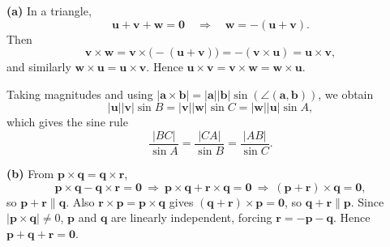 \begin{solution}
\textbf{(a)} In a triangle,
\[
\mathbf u+\mathbf v+\mathbf w=\mathbf 0
\quad\Longrightarrow\quad
\mathbf w=-(\mathbf u+\mathbf v).
\]
Then
\[
\mathbf v\times \mathbf w=\mathbf v\times\bigl(-(\mathbf u+\mathbf v)\bigr)=-(\mathbf v\times\mathbf u)=\mathbf u\times\mathbf v,
\]
and similarly \(\mathbf w\times\mathbf u=\mathbf u\times\mathbf v\). Hence
\(\mathbf u\times\mathbf v=\mathbf v\times\mathbf w=\mathbf w\times\mathbf u\).

Taking magnitudes and using \(|\mathbf a\times\mathbf b|=|\mathbf a||\mathbf b|\sin(\angle(\mathbf a,\mathbf b))\),
we obtain
\[
|\mathbf u||\mathbf v|\sin B=|\mathbf v||\mathbf w|\sin C=|\mathbf w||\mathbf u|\sin A,
\]
which gives the sine rule
\[
\frac{|BC|}{\sin A}=\frac{|CA|}{\sin B}=\frac{|AB|}{\sin C}.
\]

\medskip
\noindent\textbf{(b)} From \(\mathbf p\times\mathbf q=\mathbf q\times\mathbf r\),
\[
\mathbf p\times\mathbf q-\mathbf q\times\mathbf r=\mathbf 0
\ \Longrightarrow\
\mathbf p\times\mathbf q+\mathbf r\times\mathbf q=\mathbf 0
\ \Longrightarrow\
(\mathbf p+\mathbf r)\times\mathbf q=\mathbf 0,
\]
so \(\mathbf p+\mathbf r\parallel \mathbf q\).
Also \(\mathbf r\times\mathbf p=\mathbf p\times\mathbf q\) gives \((\mathbf q+\mathbf r)\times\mathbf p=\mathbf 0\),
so \(\mathbf q+\mathbf r\parallel \mathbf p\).
Since \(|\mathbf p\times\mathbf q|\ne 0\), \(\mathbf p\) and \(\mathbf q\) are linearly independent, forcing
\(\mathbf r=-\mathbf p-\mathbf q\). Hence \(\mathbf p+\mathbf q+\mathbf r=\mathbf 0\).
\end{solution}

